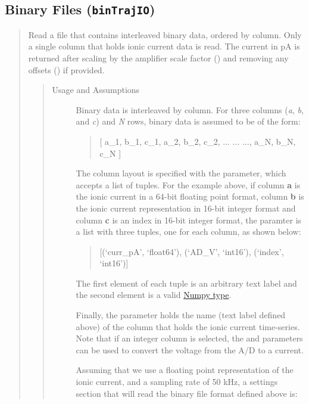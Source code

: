 \documentclass[letterpaper,10pt,english]{sphinxmanual}
\begin{document}
\subsection{Binary Files (\texttt{binTrajIO})}
\label{doc/settingsFile:binary-files-bintrajio}\begin{quote}

Read a file that contains interleaved binary data, ordered by column. Only a single
column that holds ionic current data is read. The current in pA
is returned after scaling by the amplifier scale factor () and
removing any offsets () if provided.
\begin{quote}\begin{description}
\item[{Usage and Assumptions}] \leavevmode
Binary data is interleaved by column. For three columns (\emph{a}, \emph{b}, and \emph{c}) and \emph{N} rows,
binary data is assumed to be of the form:
\begin{quote}

{[} a\_1, b\_1, c\_1, a\_2, b\_2, c\_2, ... ... ..., a\_N, b\_N, c\_N {]}
\end{quote}

The column layout is specified with the  parameter, which accepts a list of tuples.
For the example above, if column \textbf{a} is the ionic current in a 64-bit floating point format,
column \textbf{b} is the ionic current representation in 16-bit integer format and column \textbf{c} is
an index in 16-bit integer format, the  paramter is a list with three
tuples, one for each column, as shown below:
\begin{quote}

{[}(`curr\_pA', `float64'), (`AD\_V', `int16'), (`index', `int16'){]}
\end{quote}

The first element of each tuple is an arbitrary text label and the second element is
a valid \href{http://docs.scipy.org/doc/numpy/user/basics.types.html}{Numpy type}.

Finally, the  parameter holds the name (text label defined above) of the
column that holds the ionic current time-series. Note that if an integer column is selected,
the  and  parameters can be used to convert the voltage from
the A/D to a current.

Assuming that we use a floating point representation of the ionic current, and
a sampling rate of 50 kHz, a settings section that will read the binary file format
defined above is:


\end{description}
\end{quote}
\end{quote}
\end{document}
